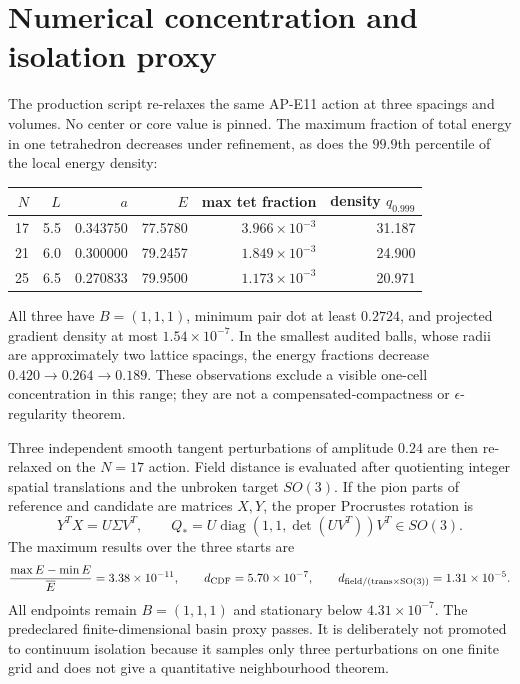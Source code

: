 \documentclass[11pt]{article}
\begin{document}
\section{Numerical concentration and isolation proxy}

The production script re-relaxes the same AP-E11 action at three spacings and
volumes.  No center or core value is pinned.  The maximum fraction of total
energy in one tetrahedron decreases under refinement, as does the $99.9$th
percentile of the local energy density:
\begin{center}
\begin{tabular}{@{}rrrrrr@{}}
\toprule
$N$&$L$&$a$&$E$&max tet fraction&density $q_{0.999}$\\
\midrule
17&5.5&0.343750&77.5780&$3.966\times10^{-3}$&31.187\\
21&6.0&0.300000&79.2457&$1.849\times10^{-3}$&24.900\\
25&6.5&0.270833&79.9500&$1.173\times10^{-3}$&20.971\\
\bottomrule
\end{tabular}
\end{center}
All three have $B=(1,1,1)$, minimum pair dot at least $0.2724$, and projected
gradient density at most $1.54\times10^{-7}$.  In the smallest audited balls,
whose radii are approximately two lattice spacings, the energy fractions
decrease $0.420\to0.264\to0.189$.  These observations exclude a visible
one-cell concentration in this range; they are not a compensated-compactness
or $\epsilon$-regularity theorem.

Three independent smooth tangent perturbations of amplitude $0.24$ are then
re-relaxed on the $N=17$ action.  Field distance is evaluated after quotienting
integer spatial translations and the unbroken target $SO(3)$.  If the pion
parts of reference and candidate are matrices $X,Y$, the proper Procrustes
rotation is
\begin{equation}
 Y^TX=U\Sigma V^T,\qquad
 Q_*=U\operatorname{diag}(1,1,\det(UV^T))V^T\in SO(3).
 \label{eq:procrustes}
\end{equation}
The maximum results over the three starts are
\begin{equation}
 \frac{\max E-\min E}{\overline E}=3.38\times10^{-11},\qquad
 d_{\rm CDF}=5.70\times10^{-7},\qquad
 d_{\rm field/(trans\times SO(3))}=1.31\times10^{-5}.
 \label{eq:finite-isolation}
\end{equation}
All endpoints remain $B=(1,1,1)$ and stationary below
$4.31\times10^{-7}$.  The predeclared finite-dimensional basin proxy passes.
It is deliberately not promoted to continuum isolation because it samples
only three perturbations on one finite grid and does not give a quantitative
neighbourhood theorem.
\end{document}
